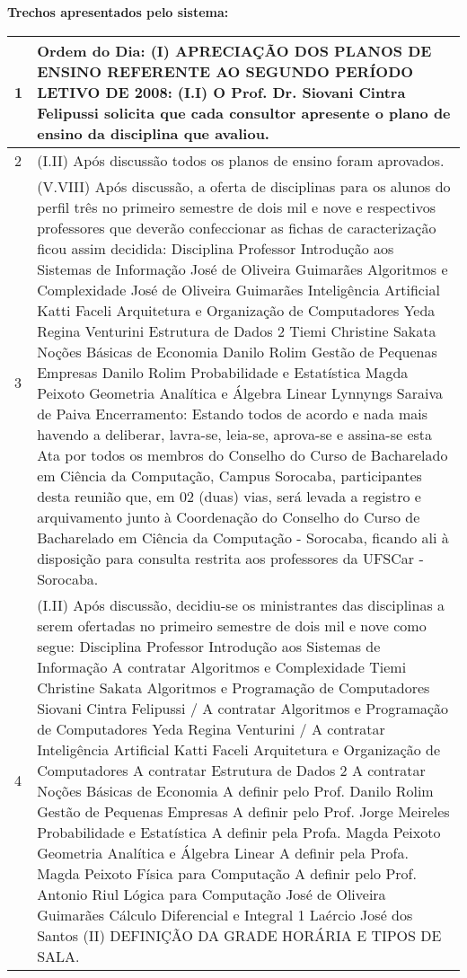 \noindent
\textbf{Trechos apresentados pelo sistema:}
\begin{longtable}{|p{0.2cm}|p{17cm}|}
\hline 
1 & 
Ordem do Dia: (I) APRECIAÇÃO DOS PLANOS DE ENSINO REFERENTE AO SEGUNDO PERÍODO LETIVO DE 2008: (I.I) O Prof. Dr. Siovani Cintra Felipussi solicita que cada consultor apresente o plano de ensino da disciplina que avaliou.
 \\ \hline 
2 &
(I.II) Após discussão todos os planos de ensino foram aprovados.
 \\ \hline 
3 &
(V.VIII) Após discussão, a oferta de disciplinas para os alunos do perfil três no primeiro semestre de dois mil e nove e respectivos professores que deverão confeccionar as fichas de caracterização ficou assim decidida: Disciplina Professor Introdução aos Sistemas de Informação José de Oliveira Guimarães Algoritmos e Complexidade José de Oliveira Guimarães Inteligência Artificial Katti Faceli Arquitetura e Organização de Computadores Yeda Regina Venturini Estrutura de Dados 2 Tiemi Christine Sakata Noções Básicas de Economia Danilo Rolim Gestão de Pequenas Empresas Danilo Rolim Probabilidade e Estatística Magda Peixoto Geometria Analítica e Álgebra Linear Lynnyngs Saraiva de Paiva Encerramento: Estando todos de acordo e nada mais havendo a deliberar, lavra-se, leia-se, aprova-se e assina-se esta Ata por todos os membros do Conselho do Curso de Bacharelado em Ciência da Computação, Campus Sorocaba, participantes desta reunião que, em 02 (duas) vias, será levada a registro e arquivamento junto à Coordenação do Conselho do Curso de Bacharelado em Ciência da Computação - Sorocaba, ficando ali à disposição para consulta restrita aos professores da UFSCar - Sorocaba.
 \\ \hline 
4 &
(I.II) Após discussão, decidiu-se os ministrantes das disciplinas a serem ofertadas no primeiro semestre de dois mil e nove como segue: Disciplina Professor Introdução aos Sistemas de Informação A contratar Algoritmos e Complexidade Tiemi Christine Sakata Algoritmos e Programação de Computadores Siovani Cintra Felipussi / A contratar Algoritmos e Programação de Computadores Yeda Regina Venturini / A contratar Inteligência Artificial Katti Faceli Arquitetura e Organização de Computadores A contratar Estrutura de Dados 2 A contratar Noções Básicas de Economia A definir pelo Prof. Danilo Rolim Gestão de Pequenas Empresas A definir pelo Prof. Jorge Meireles Probabilidade e Estatística A definir pela Profa. Magda Peixoto Geometria Analítica e Álgebra Linear A definir pela Profa. Magda Peixoto Física para Computação A definir pelo Prof. Antonio Riul Lógica para Computação José de Oliveira Guimarães Cálculo Diferencial e Integral 1 Laércio José dos Santos (II) DEFINIÇÃO DA GRADE HORÁRIA E TIPOS DE SALA.

\end{longtable}
